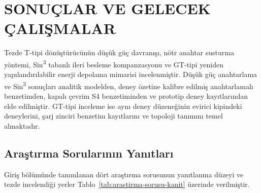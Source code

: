 \chapter{SONUÇLAR VE GELECEK ÇALIŞMALAR}
\label{chap:sonuc}

Tezde T-tipi dönüştürücünün düşük güç davranışı, nötr anahtar susturma yöntemi, Sin\textsuperscript{3} tabanlı ileri besleme kompanzasyonu ve GT-tipi yeniden yapılandırılabilir enerji depolama mimarisi incelenmiştir. Düşük güç anahtarlama ve Sin\textsuperscript{3} sonuçları analitik modelden, deney özetine kalibre edilmiş anahtarlamalı benzetimden, kapalı çevrim S4 benzetiminden ve prototip deney kayıtlarından elde edilmiştir. GT-tipi inceleme ise aynı deney düzeneğinin evirici kipindeki deneylerini, şarj zinciri benzetim kayıtlarını ve topoloji tanımını temel almaktadır.

\section{Araştırma Sorularının Yanıtları}

Giriş bölümünde tanımlanan dört araştırma sorusunun yanıtlanma düzeyi ve tezde incelendiği yerler Tablo~\ref{tab:arastirma-sorusu-kanit} üzerinde verilmiştir.

